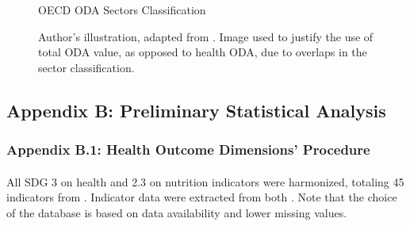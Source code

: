 \begin{figure}[H]
\captionsetup{justification=justified,singlelinecheck=false}
\caption{OECD ODA Sectors Classification}
    \label{fig:Sector ODA classification}
    \caption*{\footnotesize{Author's illustration, adapted from \textcite{oecd_Data_2023}. Image used to justify the use of total ODA value, as opposed to health ODA, due to overlaps in the sector classification.}}
\end{figure}







\subsection*{Appendix B: Preliminary Statistical Analysis}


\subsubsection*{Appendix B.1: Health Outcome Dimensions' Procedure}

\paragraph{} All SDG 3 on health and 2.3 on nutrition indicators were harmonized, totaling 45 indicators from \textcite{unsdg_sustainable_2023}. Indicator data were extracted from both \textcite{unsdg_sustainable_2023, wdi_world_2023}. Note that the choice of the database is based on data availability and lower missing values.



